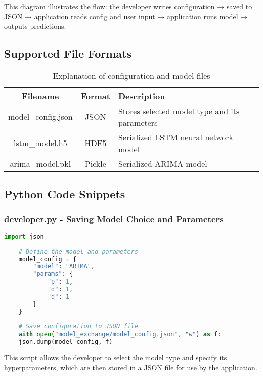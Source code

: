 This diagram illustrates the flow: the developer writes configuration → saved to JSON → application reads config and user input → application runs model → outputs predictions.

\subsection{Supported File Formats}

\begin{table}[H]
	\centering
	\begin{tabular}{|c|c|l|}
		\hline
		\textbf{Filename} & \textbf{Format} & \textbf{Description} \\
		\hline
		model\_config.json & JSON & Stores selected model type and its parameters \\
		lstm\_model.h5     & HDF5 & Serialized LSTM neural network model \\
		arima\_model.pkl   & Pickle & Serialized ARIMA model \\
		\hline
	\end{tabular}
	\caption{Explanation of configuration and model files}
\end{table}

\subsection{Python Code Snippets}

\subsubsection*{developer.py - Saving Model Choice and Parameters}
\begin{lstlisting}[language=Python, frame=single, breaklines=true]
	import json
	
	# Define the model and parameters
	model_config = {
		"model": "ARIMA",
		"params": {
			"p": 1,
			"d": 1,
			"q": 1
		}
	}
	
	# Save configuration to JSON file
	with open("model_exchange/model_config.json", "w") as f:
	json.dump(model_config, f)
\end{lstlisting}

This script allows the developer to select the model type and specify its hyperparameters, which are then stored in a JSON file for use by the application.

